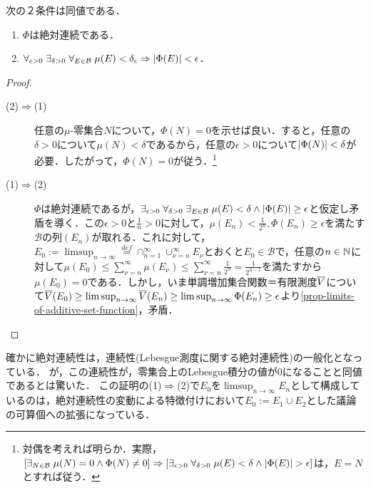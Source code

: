 \documentclass[uplatex, dvipdfmx]{jsreport}
\renewcommand{\B}{\mathcal{B}}
\begin{document}
\begin{theorem}
    次の２条件は同値である．
    \begin{enumerate}
        \item $\Phi$は絶対連続である．
        \item $\forall_{\epsilon>0}\;\exists_{\delta>0}\;\forall_{E\in\B}\;\mu(E)<\delta_\epsilon\Rightarrow\abs{\Phi(E)}<\epsilon$．
    \end{enumerate}
\end{theorem}
\begin{proof}\mbox{}
    \begin{description}
        \item[(2)$\Rightarrow$(1)] 任意の$\mu$-零集合$N$について，$\Phi(N)=0$を示せば良い．すると，任意の$\delta>0$について$\mu(N)<\delta$であるから，任意の$\epsilon>0$について$\lvert\Phi(N)\rvert<\delta$が必要．したがって，$\Phi(N)=0$が従う．\footnote{対偶を考えれば明らか．実際，$[\exists_{N\in\B}\;\mu(N)=0\land\Phi(N)\ne 0]\Rightarrow[\exists_{\epsilon>0}\;\forall_{\delta>0}\;\mu(E)<\delta\land\abs{\Phi(E)}>\epsilon]$は，$E=N$とすれば従う．}
        \item[(1)$\Rightarrow$(2)] $\Phi$は絶対連続であるが，$\exists_{\epsilon>0}\;\forall_{\delta>0}\;\exists_{E\in\B}\;\mu(E)<\delta\land\abs{\Phi(E)}\ge\epsilon$と仮定し矛盾を導く．この$\epsilon>0$と$\frac{1}{n}>0$に対して，$\mu(E_n)<\frac{1}{2^n},\Phi(E_n)\ge\epsilon$を満たす$\B$の列$(E_n)$が取れる．これに対して，$E_0:=\limsup_{n\to\infty}\overset{def}{=}\cap_{n=1}^\infty\cup_{\nu=n}^\infty E_\nu$とおくと$E_0\in\B$で，任意の$n\in\mathbb{N}$に対して$\mu(E_0)\le\sum^\infty_{\nu=n}\mu(E_\nu)\le\sum^\infty_{\nu=n}\frac{1}{2^n}=\frac{1}{2^{n-1}}$を満たすから$\mu(E_0)=0$である．しかし，いま単調増加集合関数＝有限測度$\overline{V}$について$\overline{V}(E_0)\ge\limsup_{n\to\infty}\overline{V}(E_n)\ge\limsup_{n\to\infty}\Phi(E_n)\ge\epsilon$より\ref{prop-limits-of-additive-set-function}，矛盾．
    \end{description}
\end{proof}
\begin{remarks}
    確かに絶対連続性は，連続性(Lebesgue測度に関する絶対連続性)の一般化となっている．
    が，この連続性が，零集合上のLebesgue積分の値が$0$になることと同値であるとは驚いた．
    この証明の(1)$\Rightarrow$(2)で$E_0$を$\limsup_{n\to\infty}E_n$として構成しているのは，絶対連続性の変動による特徴付けにおいて$E_0:=E_1\cup E_2$とした議論の可算個への拡張になっている．
\end{remarks}
\end{document}
